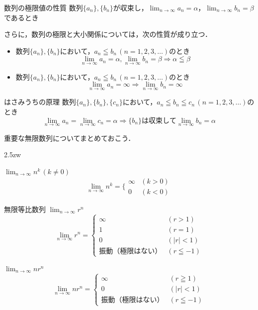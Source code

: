 \begin{titlebox}{数列の極限値の性質}
数列$\{a_n\},\{b_n\}$が収束し，$\displaystyle \lim_{n \to \infty} a_n = \alpha，\displaystyle \lim_{n \to \infty} b_n = \beta$であるとき
\end{titlebox}
さらに，数列の極限と大小関係については，次の性質が成り立つ．
\begin{itemize}
\item 数列$\{a_n\},\{b_n\}$において，$a_n\leqq b_n\,(n=1,2,3,\ldots)$のとき
\[\displaystyle \lim_{n \to \infty} a_n = \alpha,\displaystyle \lim_{n \to \infty} b_n = \beta \Longrightarrow \alpha\leqq \beta\]
\item 数列$\{a_n\},\{b_n\}$において，$a_n\leqq b_n\,(n=1,2,3,\ldots)$のとき
\[\displaystyle \lim_{n \to \infty} a_n = \infty \Longrightarrow \displaystyle \lim_{n \to \infty} b_n = \infty\]
\end{itemize}
\begin{titlebox}{はさみうちの原理}
数列$\{a_n\},\{b_n\},\{c_n\}$において，$a_n\leqq b_n\leqq c_n\,(n=1,2,3,\ldots)$のとき
\[\displaystyle \lim_{n \to \infty} a_n = \displaystyle \lim_{n \to \infty} c_n = \alpha \Longrightarrow \{b_n\} は収束して\displaystyle \lim_{n \to \infty} b_n = \alpha\]
\end{titlebox}
重要な無限数列についてまとめておこう．
\begin{Description}{2.5zw}
\item[\hskip1zw a.] $\displaystyle \lim_{n \to \infty} n^k\,(k \neq 0)$
\[ \displaystyle \lim_{n \to \infty} n^k = 
\Bigg\{\begin{array}{cl}
\infty & (k > 0)\\
0 & (k < 0)
\end{array}\]
\item[\hskip1zw b.] {無限等比数列} $\displaystyle \lim_{n \to \infty} r^n $
\[ \displaystyle \lim_{n \to \infty} r^n = 
\begin{cases}
\infty & (r > 1)\\
1 & (r = 1)\\
0 & (|r| < 1)\\
振動（極限はない） & (r \leqq -1)
\end{cases} \]
\item[\hskip1zw c.] $\displaystyle \lim_{n \to \infty} nr^n $
\[ \displaystyle \lim_{n \to \infty} nr^n = 
\begin{cases}
\infty & (r \geqq 1)\\
0 & (|r| < 1)\\
振動（極限はない） & (r \leqq -1)
\end{cases} \]
\end{Description}

